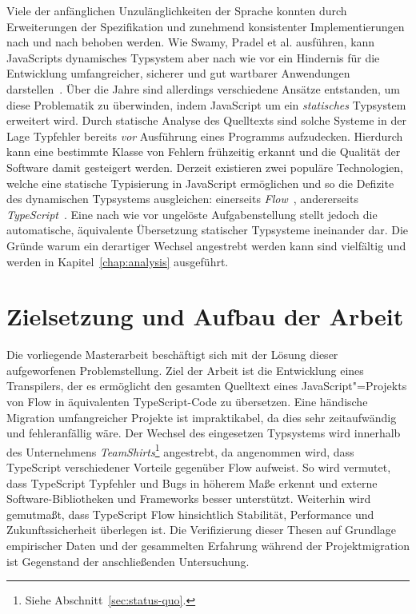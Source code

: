 Viele der anfänglichen Unzulänglichkeiten der Sprache konnten durch Erweiterungen der Spezifikation und zunehmend konsistenter Implementierungen nach und nach behoben werden. Wie Swamy, Pradel et al. ausführen, kann JavaScripts dynamisches Typsystem aber nach wie vor ein Hindernis für die Entwicklung umfangreicher, sicherer und gut wartbarer Anwendungen darstellen~\autocite{NIKHIL:2014,PRADEL:2015}. Über die Jahre sind allerdings verschiedene Ansätze entstanden, um diese Problematik zu überwinden, indem JavaScript um ein \emph{statisches} Typsystem erweitert wird. Durch statische Analyse des Quelltexts sind solche Systeme in der Lage Typfehler bereits \emph{vor} Ausführung eines Programms aufzudecken. Hierdurch kann eine bestimmte Klasse von Fehlern frühzeitig erkannt und die Qualität der Software damit gesteigert werden.
Derzeit existieren zwei populäre Technologien, welche eine statische Typisierung in JavaScript ermöglichen und so die Defizite des dynamischen Typsystems ausgleichen: einerseits \textit{Flow}~\autocite{FLOW:PAPER}, andererseits \textit{TypeScript}~\autocite{TYPESCRIPT:SPEC}. Eine nach wie vor ungelöste Aufgabenstellung stellt jedoch die automatische, äquivalente Übersetzung statischer Typsysteme ineinander dar. Die Gründe warum ein derartiger Wechsel angestrebt werden kann sind vielfältig und werden in Kapitel~\ref{chap:analysis} ausgeführt.

\section{Zielsetzung und Aufbau der Arbeit}


Die vorliegende Masterarbeit beschäftigt sich mit der Lösung dieser aufgeworfenen Problemstellung. Ziel der Arbeit ist die Entwicklung eines Transpilers, der es ermöglicht den gesamten Quelltext eines JavaScript"=Projekts von Flow in äquivalenten TypeScript-Code zu übersetzen. Eine händische Migration umfangreicher Projekte ist impraktikabel, da dies sehr zeitaufwändig und fehleranfällig wäre. Der Wechsel des eingesetzen Typsystems wird innerhalb des Unternehmens \textit{TeamShirts}\footnote{Siehe Abschnitt~\ref{sec:status-quo}.} angestrebt, da angenommen wird, dass TypeScript verschiedener Vorteile gegenüber Flow aufweist. So wird vermutet, dass TypeScript Typfehler und Bugs in höherem Maße erkennt und externe Software-Bibliotheken und Frameworks besser unterstützt. Weiterhin wird gemutmaßt, dass TypeScript Flow hinsichtlich Stabilität, Performance und Zukunftssicherheit überlegen ist. Die Verifizierung dieser Thesen auf Grundlage empirischer Daten und der gesammelten Erfahrung während der Projektmigration ist Gegenstand der anschließenden Untersuchung.


